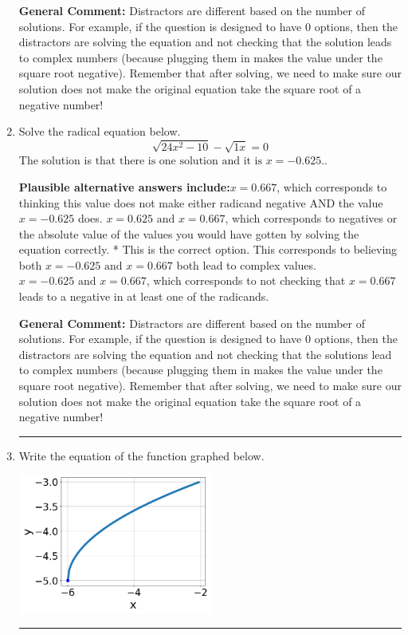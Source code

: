 \documentclass{extbook}[14pt]
\newcommand{\litem}[1]{\item #1

\rule{\textwidth}{0.4pt}}
\begin{document}
\begin{enumerate}
{\textbf{General Comment:} Distractors are different based on the number of solutions. For example, if the question is designed to have 0 options, then the distractors are solving the equation and not checking that the solution leads to complex numbers (because plugging them in makes the value under the square root negative). Remember that after solving, we need to make sure our solution does not make the original equation take the square root of a negative number!
}
\litem{
Solve the radical equation below.
\[ \sqrt{24 x^2 - 10} - \sqrt{1 x} = 0 \]The solution is \( \text{that there is one solution and it is } x = -0.625. \).\begin{enumerate}[label=\Alph*.]
\textbf{Plausible alternative answers include:}$x = 0.667$, which corresponds to thinking this value does not make either radicand negative AND the value $x = -0.625$ does.
$x = 0.625 \text{ and } x = 0.667$, which corresponds to negatives or the absolute value of the values you would have gotten by solving the equation correctly.
* This is the correct option.
This corresponds to believing both $x = -0.625 \text{ and } x = 0.667$ both lead to complex values.
$x = -0.625 \text{ and } x = 0.667$, which corresponds to not checking that $x = 0.667$ leads to a negative in at least one of the radicands.
\end{enumerate}

\textbf{General Comment:} Distractors are different based on the number of solutions. For example, if the question is designed to have 0 options, then the distractors are solving the equation and not checking that the solutions lead to complex numbers (because plugging them in makes the value under the square root negative). Remember that after solving, we need to make sure our solution does not make the original equation take the square root of a negative number!
}
\litem{
Write the equation of the function graphed below.

\begin{center}
    \includegraphics[width=0.5\textwidth]{../Figures/radicalGraphToEquationCopyB.png}
\end{center}


}
\end{enumerate}
\end{document}
